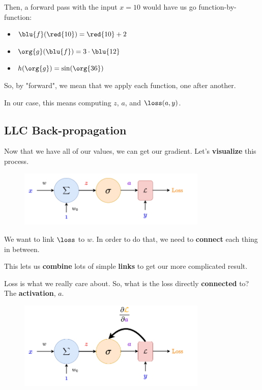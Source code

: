         Then, a forward pass with the input $x=10$ would have us go function-by-function:
        
        \begin{itemize}
            \item $\blu{f}(\red{10}) = \red{10}+2$
            
            \item $\org{g}(\blu{f}) = 3 \cdot \blu{12}$
            
            \item $h(\org{g}) = \sin(\org{36})$
        \end{itemize}
        
        So, by "forward", we mean that we apply each function, one after another.
        
        In our case, this means computing $z$, $a$, and $\loss(a,y)$.
        
    \secdiv
    
    \subsection*{LLC Back-propagation}
    
        Now that we have all of our values, we can get our gradient. Let's \textbf{visualize} this process.
        
        \begin{figure}[H]
            \centering
            \includegraphics[width=90mm,scale=0.4]{images/nn_1_5_images/llc_as_neuron_loss.png}
        \end{figure}
        
        We want to link $\loss$ to $w$. In order to do that, we need to \textbf{connect} each thing in between.
        
        This lets us \textbf{combine} lots of simple \textbf{links} to get our more complicated result.
            
        Loss is what we really care about. So, what is the loss directly \textbf{connected} to? The \textbf{activation}, $a$.
        
        \begin{figure}[H]
            \centering
            \includegraphics[width=90mm,scale=0.4]{images/nn_1_5_images/llc_backprop_1.png}
        \end{figure}
        
